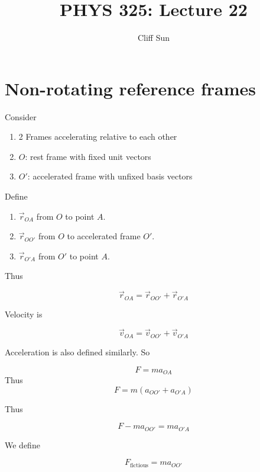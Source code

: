 \documentclass{article}
\title{PHYS 325: Lecture 22}
\author{Cliff Sun}
\newtheorem{one minute paper}[theorem]{One Minute Paper}
\begin{document}
\maketitle

\section*{Non-rotating reference frames}

Consider
\begin{enumerate}
    \item 2 Frames accelerating relative to each other
    \item $O$: rest frame with fixed unit vectors
    \item $O'$: accelerated frame with unfixed basis vectors  
\end{enumerate}

Define
\begin{enumerate}
    \item $\vec{r}_{OA}$ from $O$ to point $A$.
    \item $\vec{r}_{OO'}$ from $O$ to accelerated frame $O'$.
    \item $\vec{r}_{O'A}$ from $O'$ to point $A$. 
\end{enumerate}

Thus 

\begin{equation}
    \vec{r}_{OA} = \vec{r}_{OO'} + \vec{r}_{O'A}
\end{equation}

Velocity is 

\begin{equation}
    \vec{v}_{OA} = \vec{v}_{OO'} + \vec{v}_{O'A}
\end{equation}

Acceleration is also defined similarly. So 

\begin{equation}
    F = ma_{OA}
\end{equation}
Thus 
\begin{equation}
    F = m(a_{OO'} + a_{O'A})
\end{equation}

Thus 

\begin{equation}
    F - ma_{OO'} = ma_{O'A}
\end{equation}

We define 

\begin{equation}
    F_{\text{fictious}} = ma_{OO'}
\end{equation}
\end{document}
